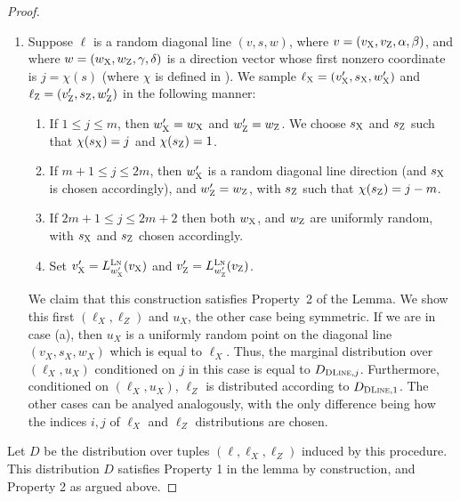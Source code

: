 \documentclass[11pt]{article}
\theoremstyle{definition}
\newcommand{\labelstyle}[1]{\ensuremath{\textsc{#1}}\xspace}
\newcommand{\xpt}{\labelstyle{X}}
\newcommand{\zpt}{\labelstyle{Z}}
\newcommand{\lnf}{\labelstyle{Ln}}
\newcommand{\typestyle}[1]{\ensuremath{\textsc{#1}}\xspace}
\renewcommand{\line}{\mathbf{\ell}}
\newcommand{\DLine}{\typestyle{DLine}}
\begin{document}
\begin{proof}
\begin{enumerate}
      \item Suppose $\ell$ is a random diagonal line $(v, s, w)$,
        where $v = (v_\xpt, v_\zpt, \alpha, \beta)$, and
        where $w = (w_\xpt, w_\zpt, \gamma, \delta) $ is a direction vector whose first nonzero coordinate is
         $j = \chi(s)$ (where $\chi$ is defined in ). We sample $\line_\xpt =  (v'_\xpt, s_\xpt,
        w'_\xpt)$ and $\line_\zpt = (v'_\zpt, s_\zpt, w'_\zpt)$ in the following
        manner:
        \begin{enumerate}
          \item If $1 \leq j \leq m$, then $w'_\xpt = w_\xpt$ and $w'_\zpt = w_\zpt$. We choose $s_\xpt$ and $s_\zpt$ such that $\chi(s_\xpt) = j$ and $\chi(s_\zpt) = 1$.
          \item If $m+1 \leq j \leq 2m$, then $w'_\xpt$ is a random
            diagonal line direction (and $s_{\xpt}$ is chosen accordingly), and $w'_\zpt = w_\zpt$, with $s_\zpt$ such that $\chi(s_\zpt) = j - m$.
          \item If $2m+1 \leq j \leq 2m+2$ then both $w_\xpt$, and
            $w_\zpt$ are uniformly random, with $s_\xpt$ and $s_\zpt$ chosen accordingly.
          \item Set $v'_\xpt = L_{w'_{\xpt}}^\lnf(v_\xpt)$ and $v'_\zpt = L_{w'_{\zpt}}^\lnf(v_\zpt)$.
          \end{enumerate}
          We claim that this construction satisfies Property~2 of the Lemma. We show this first $(\line_X,\line_Z)$ and $u_X$, the other case being symmetric.  If we are in case (a), then $u_X$ is a uniformly random point on the diagonal line $(v_X, s_X, w_X)$ which is equal to $\line_X$. Thus, the marginal distribution over $(\line_X, u_X)$ conditioned on $j$ in this case is equal to $D_{\DLine, j}$. Furthermore, conditioned on $(\line_X,u_X)$, $\line_Z$ is distributed according to $D_{\DLine,1}$. The other cases can be analyed analogously, with the only difference being how the indices $i,j$ of $\line_X$ and $\line_Z$ distributions are chosen. 
					    \end{enumerate}
	Let $D$ be the distribution over tuples $(\line, \line_X, \line_Z)$ induced by this procedure. This distribution $D$ satisfies Property 1 in the lemma by  construction, and Property 2 as argued above.
    \end{proof}
\end{document}
